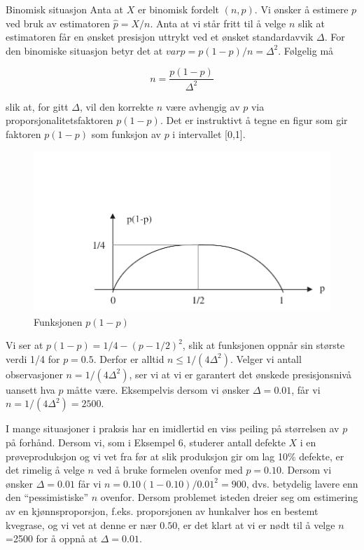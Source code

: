 \begin{eksempel}{Binomisk situasjon}
Anta at $X$ er binomisk fordelt $(n,p)$. Vi ønsker å estimere $p$
ved bruk av estimatoren $\hat{p} =X/n$. Anta at vi står fritt til å
velge $n$ slik at estimatoren får en ønsket presisjon uttrykt ved
et ønsket standardavvik $\Delta$. For den binomiske situasjon
betyr det at $var\hat{p}=p(1-p)/n={\Delta}^2$. Følgelig må

\[ n=\frac{p(1-p)}{{\Delta}^2} \]

\noindent slik at, for gitt $\Delta$, vil den korrekte $n$ være avhengig av
$p$ via propor\-sjona\-litets\-faktoren $p(1-p)$. Det er instruktivt å
tegne en figur som gir faktoren $p(1-p)$ som funksjon av $p$ i
intervallet [0,1].

\begin{figure}[ht]
\centering
   \includegraphics[scale=0.8]{figurer/fig7_4.pdf} 
 \caption{Funksjonen $p(1-p)$}
	\label{fig:p1p}
\end{figure}

Vi ser at $p(1-p)=1/4-{(p-1/2)}^2$, slik at funksjonen oppnår sin
største verdi 1/4 for $p=0.5$. Derfor er alltid $n\leq 1/(4{\Delta}^2)$.
 Velger vi antall observasjoner $n=1/(4{\Delta}^2)$,
 ser vi at vi er garantert det ønskede presisjonsnivå uansett
hva $p$ måtte være. Eksempelvis dersom vi ønsker $\Delta =0.01$,
får vi $n=1/(4{\Delta}^2)=2500$.

I mange situasjoner i praksis har en imidlertid en viss peiling
på størrelsen av $p$ på forhånd. Dersom vi, som i Eksempel
6, studerer antall defekte $X$ i en prøveproduksjon og vi vet fra
før at slik produksjon gir om lag 10\% defekte, er det rimelig å
velge $n$ ved å bruke formelen ovenfor med $p=0.10$. Dersom vi
ønsker $\Delta =0.01$ får vi $n=0.10(1-0.10)/0.01^2=900$, dvs.
betydelig lavere enn den ``pessimistiske'' $n$ ovenfor. Dersom
problemet iste\-den dreier seg om estimering av en kjønnsproporsjon,
f.eks. proporsjonen av hunkalver hos en bestemt kvegrase, og vi
vet at denne er nær $0.50$, er det klart at vi er nødt til å
velge $n$=2500 for å oppnå at $\Delta =0.01$.
\end{eksempel}


